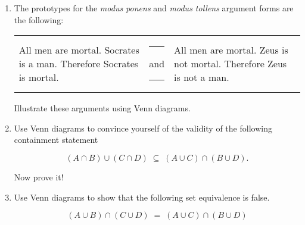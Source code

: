 \begin{enumerate}
\wbvfill

\item The prototypes for the \emph{modus ponens} and \emph{modus tollens}
argument forms are the following:

\begin{tabular}{lcl}
\begin{minipage}{.3\textwidth}All men are mortal. \newline %
Socrates is a man. \newline
Therefore Socrates is mortal.\end{minipage} & \rule{16pt}{0pt} and \rule{16pt}{0pt} & %
 \begin{minipage}{.3\textwidth}All men are mortal. \newline %
Zeus is not mortal. \newline
Therefore Zeus is not a man.\end{minipage}
\end{tabular}

Illustrate these arguments using Venn diagrams.

 
 \wbvfill
 
 \workbookpagebreak
 
\item Use Venn diagrams to convince yourself of the validity of
the following containment statement

\[ (A \cap B) \cup (C \cap D) \; \subseteq \; (A \cup C) \cap (B \cup D).\]

Now prove it!
 
 
 \wbvfill
 
 \workbookpagebreak
 
\item Use Venn diagrams to show that the following set equivalence is false.

\[ (A \cup B) \cap (C \cup D) \; = \; (A \cup C) \cap (B \cup D) \]


\wbvfill
 
 \workbookpagebreak
 
\end{enumerate}




